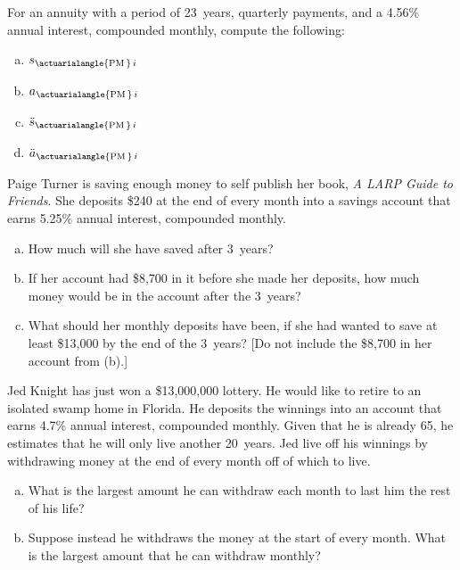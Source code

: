 \documentclass[11pt,letterpaper]{article}
\begin{document}

 For an annuity with a period of 23~years, quarterly payments, and a 4.56\% annual interest, compounded monthly, compute the following:
	\begin{enumerate}[(a)]
	\item $s_{\actuarialangle{\text{PM}\,}\, i}$
	\item $a_{\actuarialangle{\text{PM}\,}\, i}$
	\item $\ddot{s}_{\actuarialangle{\text{PM}\,}\, i}$
	\item $\ddot{a}_{\actuarialangle{\text{PM}\,}\, i}$
	\end{enumerate}



\newpage



 Paige Turner is saving enough money to self publish her book, \textit{A LARP Guide to Friends}. She deposits \$240 at the end of every month into a savings account that earns 5.25\% annual interest, compounded monthly. 
	\begin{enumerate}[(a)]
	\item How much will she have saved after 3~years?
	\item If her account had \$8,700 in it before she made her deposits, how much money would be in the account after the 3~years?
	\item What should her monthly deposits have been, if she had wanted to save at least \$13,000 by the end of the 3~years? [Do not include the \$8,700 in her account from (b).]
	\end{enumerate}



\newpage



 Jed Knight has just won a \$13,000,000 lottery. He would like to retire to an isolated swamp home in Florida. He deposits the winnings into an account that earns 4.7\% annual interest, compounded monthly. Given that he is already 65, he estimates that he will only live another 20~years. Jed live off his winnings by withdrawing money at the end of every month off of which to live.
	\begin{enumerate}[(a)]
	\item  What is the largest amount he can withdraw each month to last him the rest of his life?
	\item Suppose instead he withdraws the money at the start of every month. What is the largest amount that he can withdraw monthly? 
	\end{enumerate}
\end{document}
